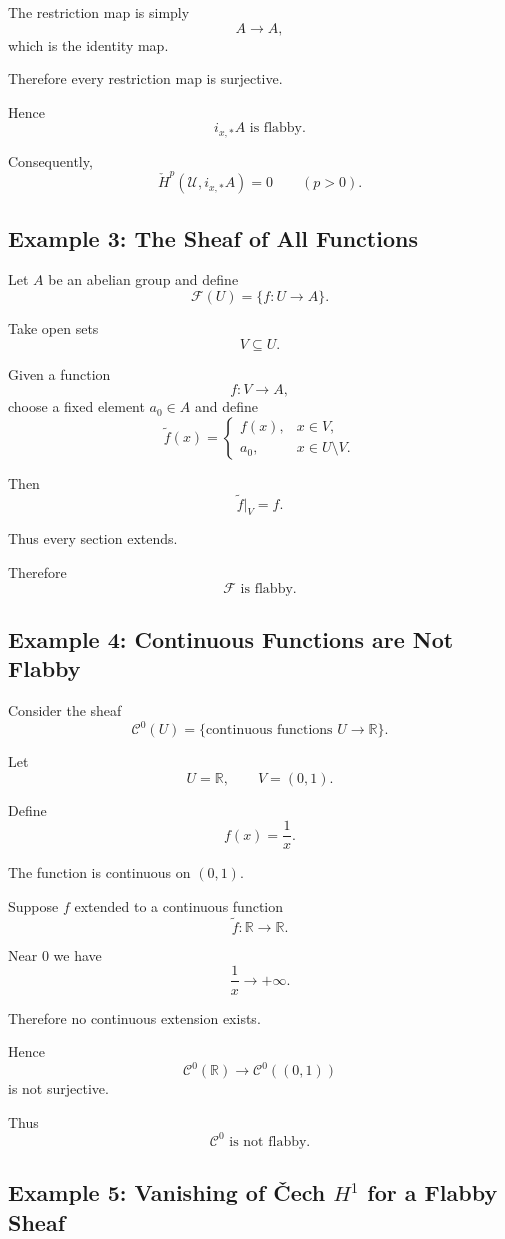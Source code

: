 \documentclass[12pt,a4paper]{article}
\theoremstyle{notespace}
\begin{document}
The restriction map is simply
\[
A\longrightarrow A,
\]
which is the identity map.

Therefore every restriction map is surjective.

Hence
\[
\boxed{i_{x,*}A \text{ is flabby.}}
\]

Consequently,
\[
\check H^p(\mathcal U,i_{x,*}A)=0
\qquad (p>0).
\]

\subsection{Example 3: The Sheaf of All Functions}

Let $A$ be an abelian group and define
\[
\mathcal F(U)
=
\{f:U\to A\}.
\]

Take open sets
\[
V\subseteq U.
\]

Given a function
\[
f:V\to A,
\]
choose a fixed element $a_0\in A$ and define
\[
\widetilde f(x)=
\begin{cases}
	f(x), & x\in V,\\
	a_0, & x\in U\setminus V.
\end{cases}
\]

Then
\[
\widetilde f|_V=f.
\]

Thus every section extends.

Therefore
\[
\boxed{\mathcal F \text{ is flabby.}}
\]

\subsection{Example 4: Continuous Functions are Not Flabby}

Consider the sheaf
\[
\mathcal C^0(U)
=
\{\text{continuous functions }U\to\mathbb R\}.
\]

Let
\[
U=\mathbb R,
\qquad
V=(0,1).
\]

Define
\[
f(x)=\frac1x.
\]

The function is continuous on $(0,1)$.

Suppose $f$ extended to a continuous function
\[
\widetilde f:\mathbb R\to\mathbb R.
\]

Near $0$ we have
\[
\frac1x\to+\infty.
\]

Therefore no continuous extension exists.

Hence
\[
\mathcal C^0(\mathbb R)
\longrightarrow
\mathcal C^0((0,1))
\]
is not surjective.

Thus
\[
\boxed{\mathcal C^0 \text{ is not flabby.}}
\]

\subsection{Example 5: Vanishing of \v{C}ech $H^1$ for a Flabby Sheaf}
\end{document}

